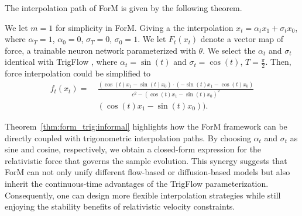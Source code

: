 The interpolation path of ForM is given by the following theorem.

\begin{theorem} \label{thm:form_trig:informal}
We let $m = 1$ for simplicity in ForM. Giving a the interpolation $x_t = \alpha_t x_1 + \sigma_t x_0$, where $\alpha_T = 1$, $\alpha_0 = 0$, $\sigma_T = 0$, $\sigma_0 = 1$. We let $F_t(x_t)$ denote a vector map of force, a trainable neuron network parameterized with $\theta$. We select the $\alpha_t$ and $\sigma_t$ identical with TrigFlow \cite{ls24}, where $\alpha_t = \sin(t)$ and $\sigma_t = \cos(t)$, $T = \frac{\pi}{2}$. Then, force interpolation could be simplified to 
\begin{align*}
    f_t(x_t) =
    & ~ \frac{(\cos(t)x_1 - \sin(t)x_0) \cdot (-\sin(t)x_1 - \cos(t)x_0)}{c^2 - (\cos(t)x_1 - \sin(t)x_0)^2}\\
    & ~ (\cos(t)x_1 - \sin(t)x_0)).
\end{align*}
\end{theorem}

Theorem~\ref{thm:form_trig:informal} highlights how the ForM framework can be directly coupled with trigonometric interpolation paths. By choosing $\alpha_t$ and $\sigma_t$ as sine and cosine, respectively, we obtain a closed-form expression for the relativistic force that governs the sample evolution. This synergy suggests that ForM can not only unify different flow-based or diffusion-based models but also inherit the continuous-time advantages of the TrigFlow parameterization. Consequently, one can design more flexible interpolation strategies while still enjoying the stability benefits of relativistic velocity constraints.


